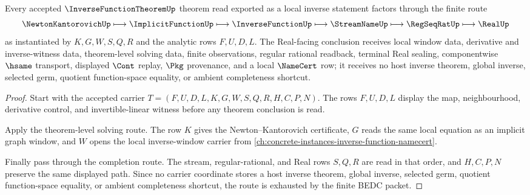 \begin{theorem}
\label{thm:inverse-function-theorem-real-completion-route}
Every accepted $\InverseFunctionTheoremUp$ theorem read exported as a local inverse statement factors through the finite route
$$
\NewtonKantorovichUp \longmapsto \ImplicitFunctionUp \longmapsto \InverseFunctionUp \longmapsto \StreamNameUp \longmapsto \RegSeqRatUp \longmapsto \RealUp
$$
as instantiated by $K,G,W,S,Q,R$ and the analytic rows $F,U,D,L$. The Real-facing conclusion receives local window data, derivative and inverse-witness data, theorem-level solving data, finite observations, regular rational readback, terminal Real sealing, componentwise $\hsame$ transport, displayed $\Cont$ replay, $\Pkg$ provenance, and a local $\NameCert$ row; it receives no host inverse theorem, global inverse, selected germ, quotient function-space equality, or ambient completeness shortcut.
\end{theorem}
\begin{proof}
Start with the accepted carrier $T=(F,U,D,L,K,G,W,S,Q,R,H,C,P,N)$. The rows $F,U,D,L$ display the map, neighbourhood, derivative control, and invertible-linear witness before any theorem conclusion is read.

Apply the theorem-level solving route. The row $K$ gives the Newton--Kantorovich certificate, $G$ reads the same local equation as an implicit graph window, and $W$ opens the local inverse-window carrier from \autoref{ch:concrete-instances-inverse-function-namecert}.

Finally pass through the completion route. The stream, regular-rational, and Real rows $S,Q,R$ are read in that order, and $H,C,P,N$ preserve the same displayed path. Since no carrier coordinate stores a host inverse theorem, global inverse, selected germ, quotient function-space equality, or ambient completeness shortcut, the route is exhausted by the finite BEDC packet.
\end{proof}



